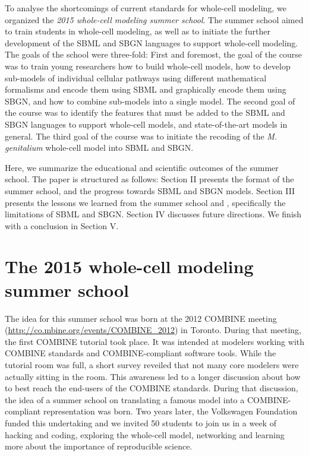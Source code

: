 \documentclass[journal,transmag]{IEEEtran}
\begin{document}
To analyse the shortcomings of current standards for whole-cell modeling, we organized the \emph{2015 whole-cell modeling summer school}. 
The summer school aimed to train students in whole-cell modeling, as well as to initiate the further development of the SBML and SBGN languages to support whole-cell modeling.  
The goals of the school were three-fold: 
First and foremost, the goal of the course was to train young researchers how to build whole-cell models, how to develop sub-models of individual cellular pathways using different mathematical formalisms and encode them using SBML and graphically encode them using SBGN, and how to combine sub-models into a single model. 
The second goal of the course was to identify the features that must be added to the SBML and SBGN languages to support whole-cell models, and state-of-the-art models in general. 
The third goal of the course was to initiate the recoding of the \textit{M. genitalium} whole-cell model into SBML and SBGN.

Here, we summarize the educational and scientific outcomes of the summer school. The paper is structured as follows: 
Section II presents the format of the summer school, and the progress towards SBML and SBGN models.  
Section III presents the lessons we learned from the summer school and , specifically  the limitations of SBML and SBGN. 
Section IV discusses future directions. 
We finish with a conclusion in Section V. 

\section{The 2015 whole-cell modeling summer school}

The idea for this summer school was born at the 2012 COMBINE meeting (\url{http://co.mbine.org/events/COMBINE_2012}) in Toronto. During that meeting, the first COMBINE tutorial took place. It was intended at modelers working with COMBINE standards and COMBINE-compliant software tools. 
While the tutorial room was full, a short survey reveiled that not many core modelers were actually sitting in the room.  
This awareness led to a longer discussion about how to best reach the end-users of the COMBINE standards. 
During that discussion, the idea of a summer school on translating a famous model into a COMBINE-compliant representation was born. 
Two years later, the Volkswagen Foundation funded this undertaking and we invited 50 students to join us in a week of hacking and coding, exploring the whole-cell model, networking and learning more about the importance of reproducible science.
 
\end{document}
